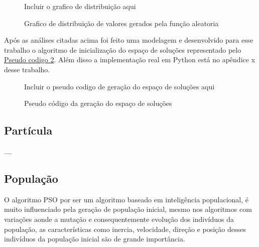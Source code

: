                 \begin{figure}[h]
                    \centering
                    \small{Incluir o grafico de distribuição aqui}
                    \caption{Grafico de distribuição de valores gerados pela função aleatoria}
                    \label{fig:distrib-uniforme}
                \end{figure}
                


            Após as análises citadas acima foi feito uma modelagem e desenvolvido para esse trabalho o algoritmo de inicialização do espaço de soluções representado pelo 
            \hyperref[fig:pseudocodigo-solutionspace]{Pseudo codigo \ref{fig:pseudocodigo-solutionspace}}. 
            Além disso a implementação real em Python está no apêndice x desse trabalho.\hfill

            \begin{figure}[h]
                \centering
                \small{Incluir o pseudo codigo de geração do espaço de soluções aqui}
                \caption{Pseudo código da geração do espaço de soluções}
                \label{fig:pseudocodigo-solutionspace}
            \end{figure}
        


    \subsection{Partícula}
        ....



    \subsection{População}
        O algoritmo PSO por ser um algoritmo baseado em inteligência populacional, é muito influenciado pela geração de população inicial, mesmo nos algoritmos com variações aonde a mutação e consequentemente evolução dos indivíduos da população, as características como inercia, velocidade, direção e posição desses indivíduos da população inicial são de grande importância.\newline


